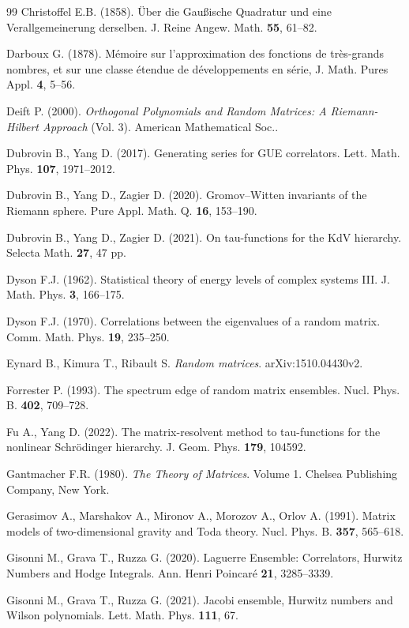 \documentclass[a4paper]{article}
\theoremstyle{plain}
\theoremstyle{definition}
\begin{document}
\begin{thebibliography}{99}
Christoffel E.B. (1858). \"Uber die Gau\ss ische Quadratur und eine Verallgemeinerung derselben. J. Reine Angew. Math. {\bf 55}, 61--82.

Darboux G. (1878). M\'emoire sur l'approximation des fonctions de tr\`es-grands nombres, et sur une classe \'etendue de d\'eveloppements en s\'erie, J. Math. Pures Appl. {\bf 4}, 5--56.

Deift P. (2000). {\it Orthogonal Polynomials and Random Matrices: A Riemann-Hilbert Approach} (Vol. 3). American Mathematical Soc..

Dubrovin B., Yang D. (2017). Generating series for GUE correlators. Lett. Math. Phys. {\bf 107}, 1971--2012.

Dubrovin B., Yang D., Zagier D. (2020). Gromov--Witten invariants of the Riemann sphere. Pure Appl. Math. Q. {\bf 16}, 153--190.

Dubrovin B., Yang D., Zagier D. (2021). On tau-functions for the KdV hierarchy. Selecta Math. {\bf 27}, 47 pp.

Dyson F.J. (1962). Statistical theory of energy levels of complex systems III. J. Math. Phys. {\bf 3}, 166--175. 

Dyson F.J. (1970). Correlations between the eigenvalues of a random matrix. Comm. Math. Phys. {\bf 19}, 235--250.

Eynard B., Kimura T., Ribault S. {\it Random matrices}. arXiv:1510.04430v2.

Forrester P. (1993). The spectrum edge of random matrix ensembles. Nucl. Phys. B. {\bf 402}, 709--728.

Fu A., Yang D. (2022). The matrix-resolvent method to tau-functions for the nonlinear Schr\"odinger hierarchy. J. Geom. Phys. {\bf 179}, 104592.

Gantmacher F.R. (1980). {\it The Theory of Matrices}. Volume 1. Chelsea Publishing Company, New York.

Gerasimov A., Marshakov A., Mironov A., Morozov A., Orlov A. (1991). Matrix models of two-dimensional gravity and Toda theory. Nucl. Phys. B. {\bf 357}, 565--618.

Gisonni M., Grava T., Ruzza G. (2020). Laguerre Ensemble: Correlators, Hurwitz Numbers and Hodge Integrals. Ann. Henri Poincaré {\bf 21}, 3285--3339.

Gisonni M., Grava T., Ruzza G. (2021). Jacobi ensemble, Hurwitz numbers and Wilson polynomials. Lett. Math. Phys. {\bf 111}, 67.


\end{thebibliography}
\end{document}
